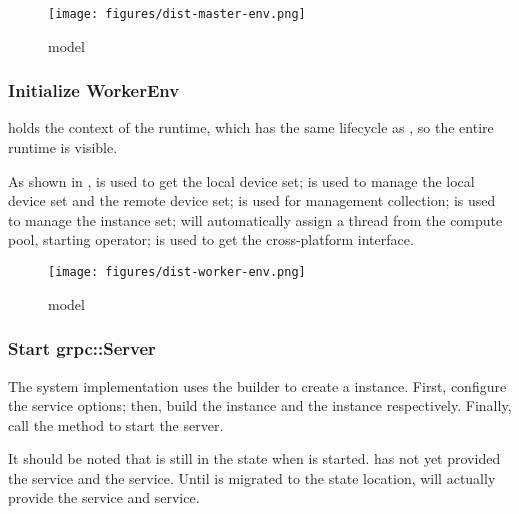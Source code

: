 \begin{content}
\begin{figure}[H]
  \centering
  \texttt{[image: figures/dist-master-env.png]}
  \caption{ model}
  \label{fig:dist-master-env}
\end{figure}


\subsubsection{Initialize WorkerEnv}
 holds the context of the  runtime, which has the same lifecycle as , so the entire  runtime is visible.

As shown in ,  is used to get the local device set;  is used to manage the local device set and the remote device set;  is used for management  collection;  is used to manage the  instance set;  will automatically assign a thread from the compute pool, starting  operator;  is used to get the cross-platform  interface.

\begin{figure}[H]
  \centering
  \texttt{[image: figures/dist-worker-env.png]}
  \caption{ model}
  \label{fig:dist-worker-env}
\end{figure}


\subsubsection{Start grpc::Server}
The system implementation uses the builder to create a  instance. First, configure the  service options; then, build the  instance and the  instance respectively. Finally, call the  method to start the  server.

It should be noted that  is still in the  state when  is started.
 has not yet provided the  service and the  service. Until  is migrated to the  state location,  will actually provide the  service and  service.


\end{content}

